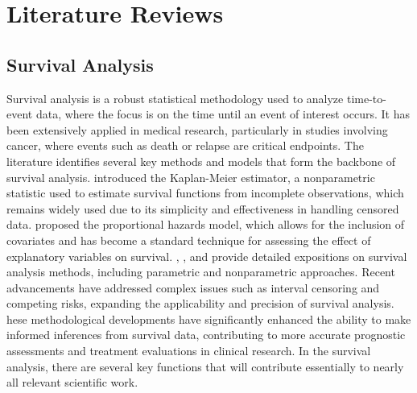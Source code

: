 \chapter{Literature Reviews}
\section{Survival Analysis}
Survival analysis is a robust statistical methodology used to analyze time-to-event data, where the focus is on the time until an event of interest occurs.
It has been extensively applied in medical research, particularly in studies involving cancer, where events such as death or relapse are critical endpoints.
The literature identifies several key methods and models that form the backbone of survival analysis. \citet{kaplan1958nonparametric} introduced the Kaplan-Meier estimator, a nonparametric statistic used to estimate survival functions from incomplete observations, which remains widely used due to its simplicity and effectiveness in handling censored data.
\citet{cox1972regression} proposed the proportional hazards model, which allows for the inclusion of covariates and has become a standard technique for assessing the effect of explanatory variables on survival.
\citet{collett2023modelling}, \citet{machin2006survival}, and \citet{kleinbaum1996survival} provide detailed expositions on survival analysis methods, including parametric and nonparametric approaches.
Recent advancements have addressed complex issues such as interval censoring and competing risks, expanding the applicability and precision of survival analysis.
hese methodological developments have significantly enhanced the ability to make informed inferences from survival data, contributing to more accurate prognostic assessments and treatment evaluations in clinical research.
In the survival analysis, there are several key functions that will contribute essentially to nearly all relevant scientific work. 

